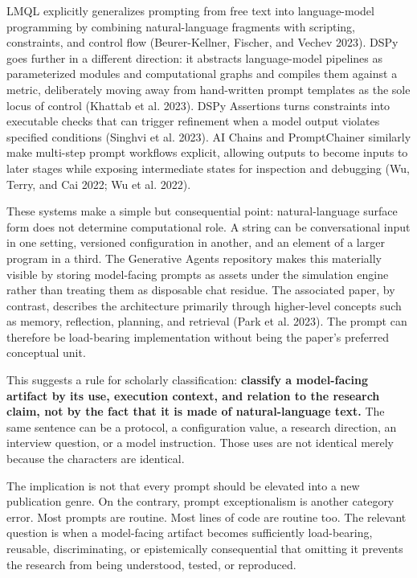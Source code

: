 \documentclass[
]{article}
\begin{document}
LMQL explicitly generalizes prompting from free text into language-model
programming by combining natural-language fragments with scripting,
constraints, and control flow (Beurer-Kellner, Fischer, and Vechev
2023). DSPy goes further in a different direction: it abstracts
language-model pipelines as parameterized modules and computational
graphs and compiles them against a metric, deliberately moving away from
hand-written prompt templates as the sole locus of control (Khattab et
al. 2023). DSPy Assertions turns constraints into executable checks that
can trigger refinement when a model output violates specified conditions
(Singhvi et al. 2023). AI Chains and PromptChainer similarly make
multi-step prompt workflows explicit, allowing outputs to become inputs
to later stages while exposing intermediate states for inspection and
debugging (Wu, Terry, and Cai 2022; Wu et al. 2022).

These systems make a simple but consequential point: natural-language
surface form does not determine computational role. A string can be
conversational input in one setting, versioned configuration in another,
and an element of a larger program in a third. The Generative Agents
repository makes this materially visible by storing model-facing prompts
as assets under the simulation engine rather than treating them as
disposable chat residue. The associated paper, by contrast, describes
the architecture primarily through higher-level concepts such as memory,
reflection, planning, and retrieval (Park et al. 2023). The prompt can
therefore be load-bearing implementation without being the paper's
preferred conceptual unit.

This suggests a rule for scholarly classification: \textbf{classify a
model-facing artifact by its use, execution context, and relation to the
research claim, not by the fact that it is made of natural-language
text.} The same sentence can be a protocol, a configuration value, a
research direction, an interview question, or a model instruction. Those
uses are not identical merely because the characters are identical.

The implication is not that every prompt should be elevated into a new
publication genre. On the contrary, prompt exceptionalism is another
category error. Most prompts are routine. Most lines of code are routine
too. The relevant question is when a model-facing artifact becomes
sufficiently load-bearing, reusable, discriminating, or epistemically
consequential that omitting it prevents the research from being
understood, tested, or reproduced.
\end{document}
